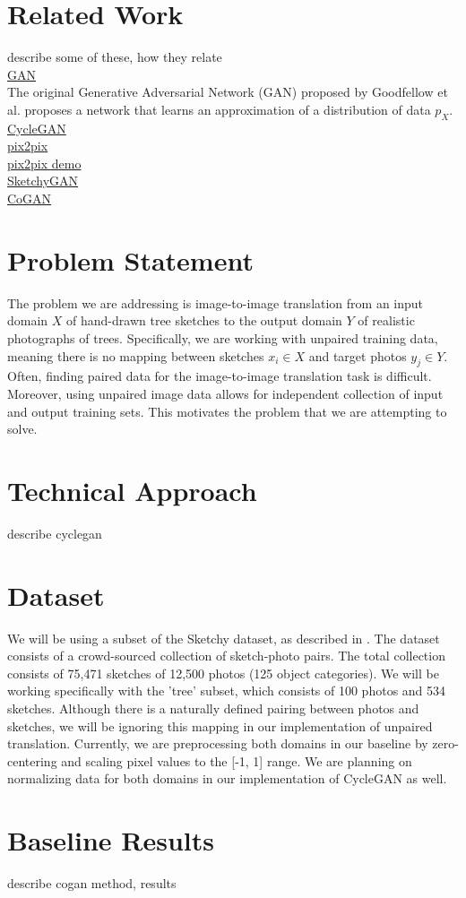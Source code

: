 \documentclass[10pt,twocolumn,letterpaper]{article}
\begin{document}
\section{Related Work}
describe some of these, how they relate \\
\href{https://arxiv.org/abs/1406.2661}{GAN} \\
The original Generative Adversarial Network (GAN) proposed by Goodfellow et al. proposes a network that learns an approximation of a distribution of data $p_{X}$.
\href{https://arxiv.org/pdf/1703.10593}{CycleGAN} \\
\href{https://arxiv.org/abs/1611.07004}{pix2pix} \\
\href{https://affinelayer.com/pixsrv/}{pix2pix demo} \\
\href{https://arxiv.org/abs/1801.02753}{SketchyGAN} \\
\href{https://arxiv.org/abs/1606.07536}{CoGAN} \\

\section{Problem Statement}
The problem we are addressing is image-to-image translation from an input domain $X$ of hand-drawn tree sketches to the output domain $Y$ of realistic photographs of trees. Specifically, we are working with unpaired training data, meaning there is no mapping between sketches $x_i\in X$ and target photos $y_j \in Y$. Often, finding paired data for the image-to-image translation task is difficult. Moreover, using unpaired image data allows for independent collection of input and output training sets. This motivates the problem that we are attempting to solve.

\section{Technical Approach}
describe cyclegan

\section{Dataset}
We will be using a subset of the Sketchy dataset, as described in \cite{sangkloy2016sketchy}. The dataset consists of a crowd-sourced collection of sketch-photo pairs. The total collection consists of 75,471 sketches of 12,500 photos (125 object categories). We will be working specifically with the 'tree' subset, which consists of 100 photos and 534 sketches. Although there is a naturally defined pairing between photos and sketches, we will be ignoring this mapping in our implementation of unpaired translation. Currently, we are preprocessing both domains in our baseline by zero-centering and scaling pixel values to the [-1, 1] range. We are planning on normalizing data for both domains in our implementation of CycleGAN as well.

\section{Baseline Results}
describe cogan method, results

{\small


}
\end{document}
